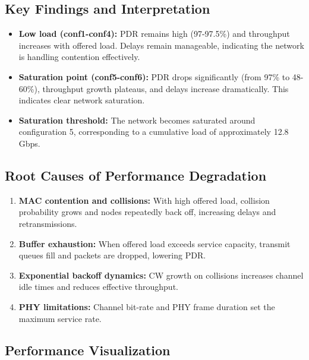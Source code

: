 \documentclass{article}
\begin{document}
\subsection{Key Findings and Interpretation}

\begin{itemize}

  \item \textbf{Low load (conf1-conf4):} PDR remains high (97-97.5\%) and throughput increases with offered load. Delays remain manageable, indicating the network is handling contention effectively.

  \item \textbf{Saturation point (conf5-conf6):} PDR drops significantly (from 97\% to 48-60\%), throughput growth plateaus, and delays increase dramatically. This indicates clear network saturation.

  \item \textbf{Saturation threshold:} The network becomes saturated around configuration 5, corresponding to a cumulative load of approximately 12.8 Gbps.

\end{itemize}

\subsection{Root Causes of Performance Degradation}

\begin{enumerate}

  \item \textbf{MAC contention and collisions:} With high offered load, collision probability grows and nodes repeatedly back off, increasing delays and retransmissions.

  \item \textbf{Buffer exhaustion:} When offered load exceeds service capacity, transmit queues fill and packets are dropped, lowering PDR.

  \item \textbf{Exponential backoff dynamics:} CW growth on collisions increases channel idle times and reduces effective throughput.

  \item \textbf{PHY limitations:} Channel bit-rate and PHY frame duration set the maximum service rate.

\end{enumerate}

\subsection{Performance Visualization}
\end{document}
